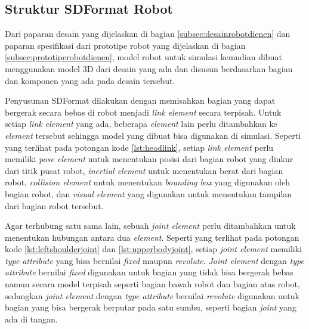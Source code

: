 \subsection{Struktur SDFormat Robot}
\label{subsec:sdformatrobot}

Dari paparan desain yang dijelaskan di bagian \ref{subsec:desainrobotdienen} dan paparan spesifikasi dari prototipe robot yang dijelaskan di bagian \ref{subsec:prototiperobotdienen},
  model robot untuk simulasi kemudian dibuat menggunakan model 3D dari desain yang ada dan disusun berdasarkan bagian dan komponen yang ada pada desain tersebut.

Penyusunan SDFormat dilakukan dengan memisahkan bagian yang dapat bergerak secara bebas di robot menjadi \emph{link element} secara terpisah.
Untuk setiap \emph{link element} yang ada,
  beberapa \emph{element} lain perlu ditambahkan ke \emph{element} tersebut sehingga model yang dibuat bisa digunakan di simulasi.
Seperti yang terlihat pada potongan kode \ref{lst:headlink},
  setiap \emph{link element} perlu memiliki \emph{pose element} untuk menentukan posisi dari bagian robot yang diukur dari titik pusat robot,
  \emph{inertial element} untuk menentukan berat dari bagian robot,
  \emph{collision element} untuk menentukan \emph{bounding box} yang digunakan oleh bagian robot,
  dan \emph{visual element} yang digunakan untuk menentukan tampilan dari bagian robot tersebut.



Agar terhubung satu sama lain,
  sebuah \emph{joint element} perlu ditambahkan untuk menentukan hubungan antara dua \emph{element}.
Seperti yang terlihat pada potongan kode \ref{lst:leftshoulderjoint} dan \ref{lst:upperbodyjoint},
  setiap \emph{joint element} memiliki \emph{type attribute} yang bisa bernilai \emph{fixed} maupun \emph{revolute}.
\emph{Joint element} dengan \emph{type attribute} bernilai \emph{fixed} digunakan untuk bagian yang tidak bisa bergerak bebas namun secara model terpisah seperti bagian bawah robot dan bagian atas robot,
  sedangkan \emph{joint element} dengan \emph{type attribute} bernilai \emph{revolute} digunakan untuk bagian yang bisa bergerak berputar pada satu sumbu, seperti bagian \emph{joint} yang ada di tangan.



